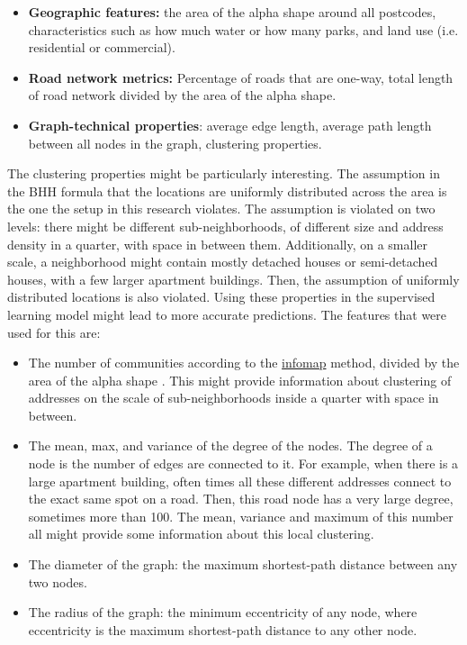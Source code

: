 \begin{itemize}
	\item \textbf{Geographic features:} the area of the alpha shape around all postcodes, characteristics such as how much water or how many parks,
	      and land use (i.e. residential or commercial).
	\item \textbf{Road network metrics:} Percentage of roads that are one-way, total length of road network divided by the area of the alpha shape.
	\item \textbf{Graph-technical properties}: average edge length, average path length between all nodes in the graph, clustering properties.
\end{itemize}

The clustering properties might be particularly interesting.
The assumption in the BHH formula that the locations are uniformly distributed across the area is the one the setup in this research violates.
The assumption is violated on two levels: there might be different sub-neighborhoods, of different size and address density in a quarter, with space in between
them.
Additionally, on a smaller scale, a neighborhood might contain mostly detached houses or semi-detached houses, with a few larger apartment buildings.
Then, the assumption of uniformly distributed locations is also violated.
Using these properties in the supervised learning model might lead to more accurate predictions. The features that were used for this are:
\begin{itemize}
	\item The number of communities according to the \url{infomap} method, divided by the area of the alpha shape \citep{rosvall2008maps}.
	      This might provide information about clustering of addresses on the scale of sub-neighborhoods inside a quarter with space in between.
	\item The mean, max, and variance of the degree of the nodes. The degree of a node is the number of edges are connected to it.
	      For example, when there is a large apartment building, often times all these different addresses connect to the exact same spot on a road.
	      Then, this road node has a very large degree, sometimes more than 100. The mean, variance and maximum of this number all might provide some information
	      about this local clustering.
	\item The diameter of the graph: the maximum shortest-path distance between any two nodes.
	\item The radius of the graph: the minimum eccentricity of any node, where eccentricity is the maximum shortest-path distance to any other node.
\end{itemize}
